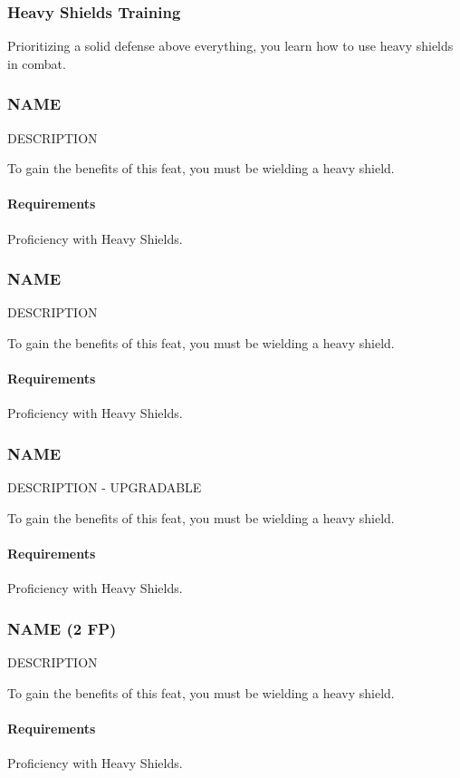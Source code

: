 \subsubsection{Heavy Shields Training} \label{feat::heavyshieldtraining}
    Prioritizing a solid defense above everything, you learn how to use heavy shields in combat.
\subsubsection{NAME} \label{feat::name}
    DESCRIPTION

    To gain the benefits of this feat, you must be wielding a heavy shield.
    \paragraph{Requirements} Proficiency with Heavy Shields.
\subsubsection{NAME} \label{feat::name}
    DESCRIPTION

    To gain the benefits of this feat, you must be wielding a heavy shield.
    \paragraph{Requirements} Proficiency with Heavy Shields.
\subsubsection{NAME} \label{feat::name}
    DESCRIPTION - UPGRADABLE

    To gain the benefits of this feat, you must be wielding a heavy shield.
    \paragraph{Requirements} Proficiency with Heavy Shields.
\subsubsection{NAME (2 FP)} \label{feat::name}
    DESCRIPTION

    To gain the benefits of this feat, you must be wielding a heavy shield.
    \paragraph{Requirements} Proficiency with Heavy Shields.

